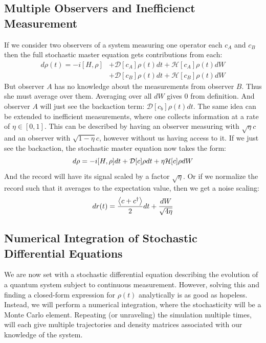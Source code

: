 \subsection{Multiple Observers and Inefficienct Measurement}\label{sec:sme_inefficient}
If we consider two observers of a system measuring one operator each $c_A$ and $c_B$ then the full stochastic master equation gets contributions from each:
\begin{align*}
    d\rho(t) = -i[H, \rho] &+ \mathcal{D}[c_A]\rho(t) dt + \mathcal{H}[c_A]\rho(t) dW \\
                           &+ \mathcal{D}[c_B]\rho(t) dt + \mathcal{H}[c_B]\rho(t) dW
\end{align*}
But observer $A$ has no knowledge about the measurements from observer $B$. Thus she must average over them. Averaging over all $dW$ gives $0$ from definition. And observer $A$ will just see the backaction term: $\mathcal{D}[c_b] \rho(t) dt$. The same idea can be extended to inefficient measurements, where one collects information at a rate of $\eta\in[0, 1]$. This can be described by having an observer measuring with $\sqrt{\eta} c$ and an observer with $\sqrt{1 - \eta}c$, however without us having access to it. If we just see the backaction, the stochastic master equation now takes the form:
\begin{equation}
    d\rho = -i \comm{H}{\rho}dt + \mathcal{D}[c]\rho dt + \eta \mathcal{H}[c] \rho dW
\end{equation}
And the record will have its signal scaled by a factor $\sqrt{\eta}$. Or if we normalize the record such that it averages to the expectation value, then we get a noise scaling:
\begin{equation}
    dr(t) = \frac{\expval{c + c^\dagger}}{2}dt + \frac{dW}{\sqrt{4\eta}}
\end{equation}

\subsection{Numerical Integration of Stochastic Differential Equations}
We are now set with a stochastic differential equation describing the evolution of a quantum system subject to continuous measurement. However, solving this and finding a closed-form expression for $\rho(t)$ analytically is as good as hopeless. Instead, we will perform a numerical integration, where the stochasticity will be a Monte Carlo element. Repeating (or unraveling) the simulation multiple times, will each give multiple trajectories and density matrices associated with our knowledge of the system. 

